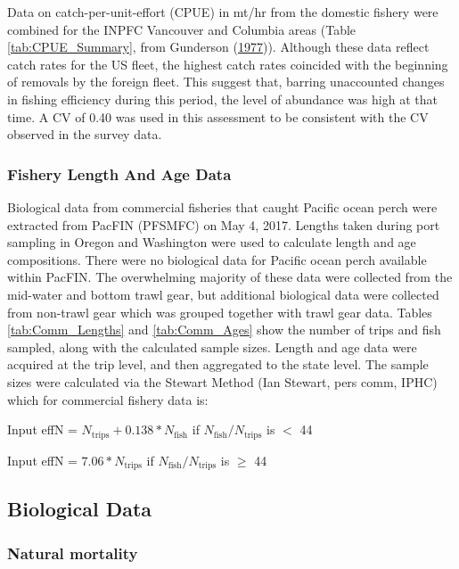 \documentclass[12pt,]{article}
\begin{document}
Data on catch-per-unit-effort (CPUE) in mt/hr from the domestic fishery
were combined for the INPFC Vancouver and Columbia areas (Table
\ref{tab:CPUE_Summary}, from Gunderson
(\protect\hyperlink{ref-gunderson_population_1977}{1977})). Although
these data reflect catch rates for the US fleet, the highest catch rates
coincided with the beginning of removals by the foreign fleet. This
suggest that, barring unaccounted changes in fishing efficiency during
this period, the level of abundance was high at that time. A CV of 0.40
was used in this assessment to be consistent with the CV observed in the
survey data.

\subsubsection{Fishery Length And Age
Data}\label{fishery-length-and-age-data}

Biological data from commercial fisheries that caught Pacific ocean
perch were extracted from PacFIN (PFSMFC) on May 4, 2017. Lengths taken
during port sampling in Oregon and Washington were used to calculate
length and age compositions. There were no biological data for Pacific
ocean perch available within PacFIN. The overwhelming majority of these
data were collected from the mid-water and bottom trawl gear, but
additional biological data were collected from non-trawl gear which was
grouped together with trawl gear data. Tables \ref{tab:Comm_Lengths} and
\ref{tab:Comm_Ages} show the number of trips and fish sampled, along
with the calculated sample sizes. Length and age data were acquired at
the trip level, and then aggregated to the state level. The sample sizes
were calculated via the Stewart Method (Ian Stewart, pers comm, IPHC)
which for commercial fishery data is:

\begin{centering}

Input effN = $N_{\text{trips}} + 0.138 * N_{\text{fish}}$ if $N_{\text{fish}}/N_{\text{trips}}$ is $<$ 44

Input effN = $7.06 * N_{\text{trips}}$ if $N_{\text{fish}}/N_{\text{trips}}$ is $\geq$ 44

\end{centering}

\subsection{Biological Data}\label{biological-data}

\subsubsection{Natural mortality}\label{natural-mortality}
\end{document}
